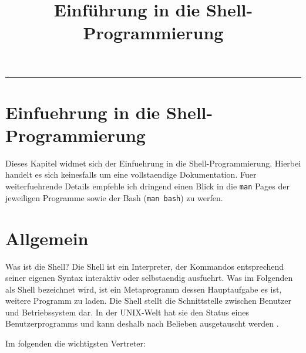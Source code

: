 \documentclass[12pt,]{article}
\title{Einführung in die Shell-Programmierung}
\date{}
\begin{document}
\maketitle

{
\hypersetup{linkcolor=black}
\setcounter{tocdepth}{3}
\tableofcontents
}
\begin{center}\rule{0.5\linewidth}{\linethickness}\end{center}

\section{Einfuehrung in die
Shell-Programmierung}\label{einfuehrung-in-die-shell-programmierung}

Dieses Kapitel widmet sich der Einfuehrung in die Shell-Programmierung.
Hierbei handelt es sich keinesfalls um eine vollstaendige Dokumentation.
Fuer weiterfuehrende Details empfehle ich dringend einen Blick in die
\texttt{man} Pages der jeweiligen Programme sowie der Bash
(\texttt{man\ bash}) zu werfen.

\section{Allgemein}\label{allgemein}

Was ist die Shell? Die Shell ist ein Interpreter, der Kommandos
entsprechend seiner eigenen Syntax interaktiv oder selbstaendig
ausfuehrt. Was im Folgenden als Shell bezeichnet wird, ist ein
Metaprogramm dessen Hauptaufgabe es ist, weitere Programm zu laden. Die
Shell stellt die Schnittstelle zwischen Benutzer und Betriebssystem dar.
In der UNIX-Welt hat sie den Status eines Benutzerprogramms und kann
deshalb nach Belieben ausgetauscht werden .

Im folgenden die wichtigsten Vertreter:
\end{document}
